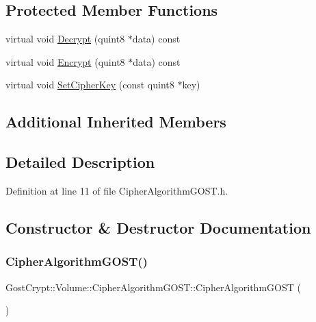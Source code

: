 \subsection*{Protected Member Functions}
\begin{DoxyCompactItemize}
\item 
virtual void \hyperlink{class_gost_crypt_1_1_volume_1_1_cipher_algorithm_g_o_s_t_a9412774777c6cd1b7d529885d9f1f681}{Decrypt} (quint8 $\ast$data) const
\item 
virtual void \hyperlink{class_gost_crypt_1_1_volume_1_1_cipher_algorithm_g_o_s_t_a9fc68f435da2c76dc944aa6bb36bddc5}{Encrypt} (quint8 $\ast$data) const
\item 
virtual void \hyperlink{class_gost_crypt_1_1_volume_1_1_cipher_algorithm_g_o_s_t_ac2ccc5e5b4afa45c64775d5e296b8a91}{Set\+Cipher\+Key} (const quint8 $\ast$key)
\end{DoxyCompactItemize}
\subsection*{Additional Inherited Members}


\subsection{Detailed Description}


Definition at line 11 of file Cipher\+Algorithm\+G\+O\+S\+T.\+h.



\subsection{Constructor \& Destructor Documentation}
\mbox{\label{class_gost_crypt_1_1_volume_1_1_cipher_algorithm_g_o_s_t_a259dcdbaf73aabe2575e56bf7c2abfb4}} 
\subsubsection{\texorpdfstring{Cipher\+Algorithm\+G\+O\+S\+T()}{CipherAlgorithmGOST()}}
{\footnotesize\ttfamily Gost\+Crypt\+::\+Volume\+::\+Cipher\+Algorithm\+G\+O\+S\+T\+::\+Cipher\+Algorithm\+G\+O\+ST (\begin{DoxyParamCaption}{ }\end{DoxyParamCaption})\hspace{0.3cm}{\ttfamily [inline]}}



